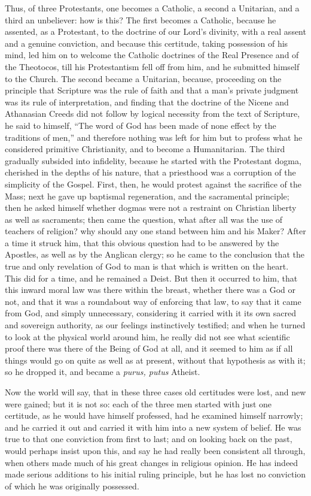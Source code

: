 Thus, of three Protestants, one becomes a Catholic, a second a
Unitarian, and a third an unbeliever: how is this? The first becomes a
Catholic, because he assented, as a Protestant, to the doctrine of our
Lord's divinity, with a real assent and a genuine conviction, and
because this certitude, taking possession of his mind, led him on to
welcome the Catholic doctrines of the Real Presence and of the
Theotocos, till his Protestantism fell off from him, and he submitted
himself to the Church. The second became a Unitarian, because,
proceeding on the principle that Scripture was the rule of faith and
that a man's private judgment was its rule of interpretation, and finding that the doctrine of the Nicene and Athanasian Creeds did
not follow by logical necessity from the text of Scripture, he said to
himself, ``The word of God has been made of none effect by the
traditions of men,'' and therefore nothing was left for him but to
profess what he considered primitive Christianity, and to become a
Humanitarian. The third gradually subsided into infidelity, because he
started with the Protestant dogma, cherished in the depths of his
nature, that a priesthood was a corruption of the simplicity of the
Gospel. First, then, he would protest against the sacrifice of the
Mass; next he gave up baptismal regeneration, and the sacramental
principle; then he asked himself whether dogmas were not a restraint
on Christian liberty as well as sacraments; then came the question,
what after all was the use of teachers of religion? why should any one
stand between him and his Maker? After a time it struck him, that this
obvious question had to be answered by the Apostles, as well as by the
Anglican clergy; so he came to the conclusion that the true and only
revelation of God to man is that which is written on the heart. This
did for a time, and he remained a Deist. But then it occurred to him,
that this inward moral law was there within the breast, whether there
was a God or not, and that it was a roundabout way of enforcing that
law, to say that it came from God, and simply unnecessary, considering
it carried with it its own sacred and sovereign authority, as our
feelings instinctively testified; and when he turned to look at the
physical world around him, he really did not see what scientific proof
there was there of the Being of God at all, and it seemed to him
as if all things would go on quite as well as at present, without that
hypothesis as with it; so he dropped it, and became a \emph{purus, putus}
Atheist.

Now the world will say, that in these three cases old certitudes
were lost, and new were gained; but it is not so: each of the three
men started with just one certitude, as he would have himself
professed, had he examined himself narrowly; and he carried it out and
carried it with him into a new system of belief. He was true to that
one conviction from first to last; and on looking back on the past,
would perhaps insist upon this, and say he had really been consistent
all through, when others made much of his great changes in religious
opinion. He has indeed made serious additions to his initial ruling
principle, but he has lost no conviction of which he was originally
possessed.


